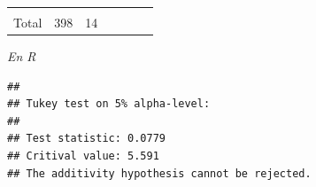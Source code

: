 \documentclass[]{book}
\theoremstyle{definition}
\theoremstyle{definition}
\theoremstyle{definition}
\theoremstyle{remark}
\begin{document}
\begin{longtable}[]{@{}lllllll@{}}
\begin{minipage}[t]{0.07\columnwidth}
\strut
\end{minipage} & \begin{minipage}[t]{0.08\columnwidth}\raggedright
\strut
\end{minipage} & \begin{minipage}[t]{0.13\columnwidth}\raggedright
\strut
\end{minipage}\tabularnewline
\begin{minipage}[t]{0.15\columnwidth}\raggedright
Total\strut
\end{minipage} & \begin{minipage}[t]{0.11\columnwidth}\raggedright
398\strut
\end{minipage} & \begin{minipage}[t]{0.11\columnwidth}\raggedright
14\strut
\end{minipage} & \begin{minipage}[t]{0.15\columnwidth}\raggedright
\strut
\end{minipage} & \begin{minipage}[t]{0.07\columnwidth}\raggedright
\strut
\end{minipage} & \begin{minipage}[t]{0.08\columnwidth}\raggedright
\strut
\end{minipage} & \begin{minipage}[t]{0.13\columnwidth}\raggedright
\strut
\end{minipage}\tabularnewline
\bottomrule
\end{longtable}

\emph{En R}

\begin{verbatim}
## 
## Tukey test on 5% alpha-level:
## 
## Test statistic: 0.0779 
## Critival value: 5.591 
## The additivity hypothesis cannot be rejected.
\end{verbatim}
\end{document}

